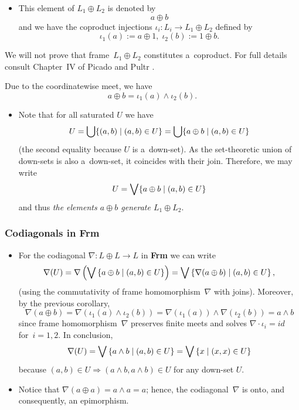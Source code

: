 \begin{itemize}
\item This element of $L_1 \oplus L_2$ is denoted by
\[
  a \oplus b
\]
and we have the coproduct injections $\iota_i: L_i \to L_1 \oplus
L_2$ defined by
\[
  \iota_1(a) := a \oplus 1, \; \iota_2(b) := 1 \oplus b.
\]
\end{itemize}

We will not prove that frame~$L_1 \oplus L_2$ constitutes a~coproduct.
For full details consult Chapter~IV of Picado and Pultr
\cite{picado-pultr12}.

\begin{cor}
 \label{oplus-iota}
Due to the coordinatewise meet, we have
\[
  a \oplus b = \iota_1(a) \wedge \iota_2(b).
\]
\end{cor}

\begin{itemize}
\item
Note that for all saturated $U$ we have
\[
  U
  = \bigcup \{ (a, b) \mid (a, b)\in U \} = \bigcup \{ a \oplus b \mid (a, b)\in
  U \}
\]
(the second equality because $U$ is a~down-set).
As the set-theoretic union of down-sets is also a~down-set, it coincides with
their join.
Therefore, we may write
\[
  U
  = \bigvee \{ a \oplus b \mid (a, b)\in U \}
\]
and thus
 \label{a+b-gen}
\emph{the elements $a \oplus b$ generate $L_1 \oplus L_2$\/}.
\end{itemize}

\subsubsection*{Codiagonals in Frm}

\begin{itemize}
\item \label{codiag-in-Frm}
For the codiagonal $\nabla\colon L \oplus L \to L$ in {\bf Frm} we can write
\[
  \nabla(U)
  = \nabla \left( \bigvee \left\{ a \oplus b \mid (a, b)\in U \right\} \right)
  = \bigvee \left\{ \nabla(a \oplus b) \mid (a, b)\in U \right\},
\]
(using the commutativity of frame homomorphism~$\nabla$ with joins).
Moreover, by the previous corollary,
\[
  \nabla(a \oplus b)
  = \nabla( \iota_1(a) \wedge \iota_2(b) )
  = \nabla(\iota_1(a)) \wedge \nabla(\iota_2(b))
  = a \wedge b
\]
since frame homomorphism~$\nabla$ preserves finite meets and solves
$\nabla\cdot \iota_i = id$ for~$i = 1, 2$.
In conclusion,
\[
  \nabla(U)
  = \bigvee \left\{ a \wedge b \mid (a, b)\in U \right\}
  = \bigvee \left\{ x \mid (x, x)\in U \right\}
\]
because $(a, b)\in U \Rightarrow (a \wedge b, a \wedge b)\in U$ for any
down-set $U$.

\item Notice that $\nabla(a \oplus a) = a \wedge a = a$; hence, the
codiagonal~$\nabla$ is onto, and consequently, an epimorphism.
\end{itemize}


